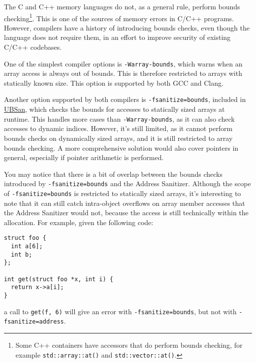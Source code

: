 \documentclass[
  a4paper,
]{report}
\begin{document}
The C and C++ memory languages do not, as a general rule, perform bounds
checking\footnote{Some C++ containers have accessors that do perform
  bounds checking, for example \texttt{std::array::at()} and
  \texttt{std::vector::at()}.}. This is one of the sources of memory
errors in C/C++ programs. However, compilers have a history of
introducing bounds checks, even though the language does not require
them, in an effort to improve security of existing C/C++ codebases.

One of the simplest compiler options is \texttt{-Warray-bounds}, which
warns when an array access is always out of bounds. This is therefore
restricted to arrays with statically known size. This option is
supported by both GCC and Clang.

Another option supported by both compilers is
\texttt{-fsanitize=bounds}, included in \hyperref[sanitizers]{UBSan},
which checks the bounds for accesses to statically sized arrays at
runtime. This handles more cases than \texttt{-Warray-bounds}, as it can
also check accesses to dynamic indices. However, it's still limited, as
it cannot perform bounds checks on dynamically sized arrays, and it is
still restricted to array bounds checking. A more comprehensive solution
would also cover pointers in general, especially if pointer arithmetic
is performed.

You may notice that there is a bit of overlap between the bounds checks
introduced by \texttt{-fsanitize=bounds} and the Address Sanitizer.
Although the scope of \texttt{-fsanitize=bounds} is restricted to
statically sized arrays, it's interesting to note that it can still
catch intra-object overflows on array
member accesses that the Address Sanitizer would not, because the access
is still technically within the allocation. For example, given the
following code:

\begin{verbatim}
struct foo {
  int a[6];
  int b;
};

int get(struct foo *x, int i) {
  return x->a[i];
}
\end{verbatim}

a call to \texttt{get(f,\ 6)} will give an error with
\texttt{-fsanitize=bounds}, but not with \texttt{-fsanitize=address}.
\end{document}
